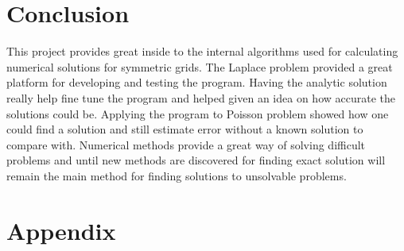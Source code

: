 \documentclass[paper=a4, fontsize=11pt, abstract=on]{scrartcl}
\numberwithin{equation}{section}		%
\numberwithin{figure}{section}			%
\numberwithin{table}{section}				%
\begin{document}
\section{Conclusion}
This project provides great inside to the internal algorithms used for calculating numerical solutions for symmetric grids. The Laplace problem provided a great platform for developing and testing the program. Having the analytic solution really help fine tune the program and helped given an idea on how accurate the solutions could be. Applying the program to Poisson problem showed how one could find a solution and still estimate error without a known solution to compare with. Numerical methods provide a great way of solving difficult problems and until new methods are discovered for finding exact solution will remain the main method for finding solutions to unsolvable problems. 






\appendix
\section{Appendix} \label{App:Appendix}
\end{document}
